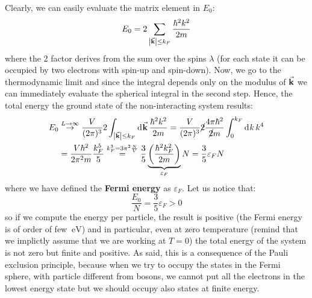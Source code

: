 \documentclass[../main/main.tex]{subfiles}
\begin{document}
Clearly, we can easily evaluate the matrix element in \( E_0 \):
\begin{equation*}
  E_0 = 2 \sum_{\abs{\va{k}} \le k_F }^{}  \frac{\hbar ^2 k^2}{2m}
\end{equation*}
where the 2 factor derives from the sum over the spins \( \lambda  \) (for each state it can be occupied by two electrons with spin-up and spin-down).
Now, we go to the thermodynamic limit and since the integral depends only on the modulus of \( \va{k} \) we can immediately evaluate the spherical integral in the second step. Hence, the total energy the ground state of the non-interacting system results:
\begin{equation*}
\begin{split}
  E_0 & \overset{L \rightarrow \infty }{\rightarrow } \frac{V}{(2 \pi )^3}
  2  \int_{\abs{\va{k}} \le k_F}^{} \dd[]{\va{k}} \frac{\hbar ^2 k^2}{2m}
  =   \frac{V}{(2 \pi )^3} \cancel{2} \frac{4 \pi \hbar ^2}{\cancel{2}m }
  \int_{0}^{k_F} \dd[]{k} k^4
   \\
   & = \frac{V \hbar ^2}{2 \pi ^2 m} \frac{k_F^5}{5}
   \overset{k_F^3=3 \pi ^2 \frac{N}{V}}{=} \frac{3}{5} \underbrace{\qty(\frac{\hbar ^2 k_F^2}{2m}) }_{\varepsilon _F} N = \frac{3}{5} \varepsilon _F N
\end{split}
\end{equation*}
where we have defined the \textbf{Fermi energy} as \( \varepsilon _F \).
Let us notice that: 
\begin{equation*}
  \frac{E_0}{N} = \frac{3}{5} \varepsilon _F > 0
\end{equation*}
so if we compute the energy per particle, the result is positive (the Fermi energy is of order of few \( \SI{}{\eV}  \)) and in particular, even at zero temperature (remind that we implictly assume that we are working at \( T=0 \)) the total energy of the system is not zero but finite and positive.
As said, this is a consequence of the Pauli exclusion principle, because when we try to occupy the states in the Fermi sphere, with particle different from bosons, we cannot put all the electrons in the lowest energy state but we should occupy also states at finite energy.
\end{document}
